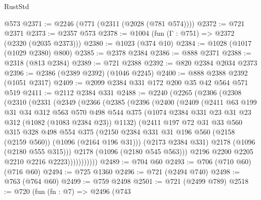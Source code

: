 \begin{lexlean}{RustStd}
\begin{coremodule}
    @573
@2371 := @2246 (@771 (@2311 (@2028 (@781 @574))))
@2372 := @721 @2371
@2373 := @2357 @573
@2378 := @1004 (fun (Γ : @751) => @2372 (@2320 (@2035 @2373)))
@2380 := @1023 (@374 @10)
@2384 := @1028 (@1017 (@1029 @2380) @800)
@2385 := @2378 @2384
@2386 := @888 @2371
@2388 := @2318 (@813 @2384)
@2389 := @721 @2388
@2392 := @820 @2384 @2034 @2373
@2396 := @2386 (@2389 @2392) (@1046 @2245)
@2400 := @888 @2388 @2392 (@1051 @2317)
@2409 := @2099 @2384 @331 @172 @200 @35 @42 @564 @571 @519
@2411 := @2112 @2384 @331
@2488 := @2240
    (@2265
      (@2306
        (@2308
          (@2310
            (@2331
              (@2349
                (@2366
                  (@2385
                    (@2396
                      (@2400
                        (@2409
                          (@2411
                            @63
                            @199
                            @31
                            @34
                            @312
                            @563
                            @570
                            @498
                            @544
                            @375
                            (@1074 @2384 @331 @23 @31 @23 @312 (@1082 (@1083 @2384 @23)) @1132)
                            (@2411
                              @197
                              @72
                              @31
                              @33
                              @560
                              @315
                              @328
                              @498
                              @554
                              @375
                              (@2150
                                @2384
                                @331
                                @31
                                @196
                                @560
                                (@2158 (@2159 @560))
                                (@1096 (@2164 @196 @31)))
                              (@2173 @2384 @331)
                              @2178
                              (@1096 (@2180 @555 @315)))
                            @2178
                            (@1096 (@2180 @545 @563)))
                          @2196
                          @2200
                          @2205
                          @2210
                          @2216
                          @2223)))))))))))
@2489 := @704 @60
@2493 := @706 (@710 @60) (@716 @60)
@2494 := @725 @1360
@2496 := @721 (@2494 @740)
@2498 := @763 (@764 @60)
@2499 := @759 @2498
@2501 := @721 (@2499 @789)
@2518 := @720
    (fun (fn : @7) =>
    @2496
      (@743

\end{coremodule}
\end{lexlean}
